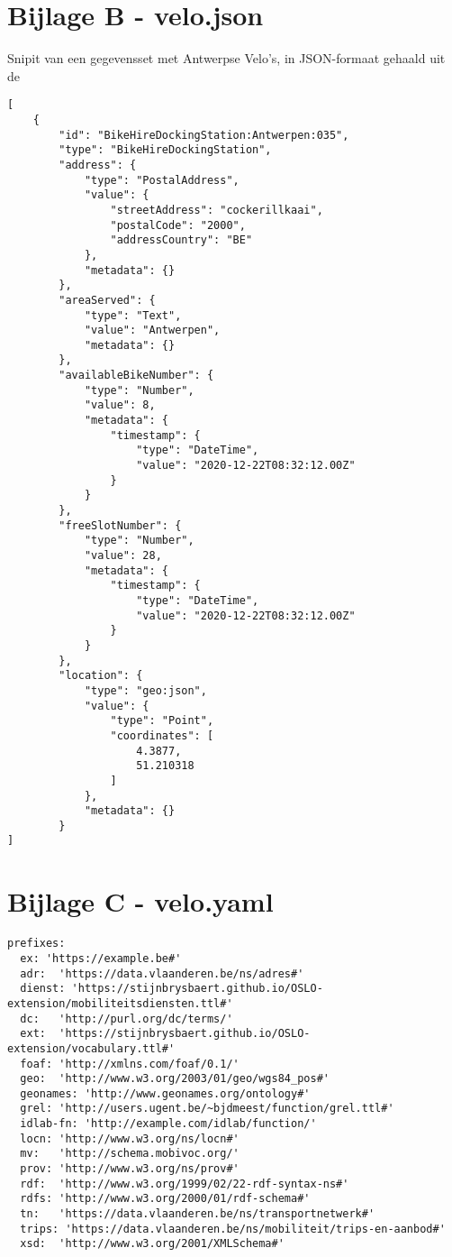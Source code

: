 \begin{appendices}
\section*{Bijlage B - velo.json}
\label{app:velo.json}
Snipit van een gegevensset met Antwerpse Velo's, in JSON-formaat gehaald uit de 
\begin{code}
\begin{verbatim}
[
    {
        "id": "BikeHireDockingStation:Antwerpen:035",
        "type": "BikeHireDockingStation",
        "address": {
            "type": "PostalAddress",
            "value": {
                "streetAddress": "cockerillkaai",
                "postalCode": "2000",
                "addressCountry": "BE"
            },
            "metadata": {}
        },
        "areaServed": {
            "type": "Text",
            "value": "Antwerpen",
            "metadata": {}
        },
        "availableBikeNumber": {
            "type": "Number",
            "value": 8,
            "metadata": {
                "timestamp": {
                    "type": "DateTime",
                    "value": "2020-12-22T08:32:12.00Z"
                }
            }
        },
        "freeSlotNumber": {
            "type": "Number",
            "value": 28,
            "metadata": {
                "timestamp": {
                    "type": "DateTime",
                    "value": "2020-12-22T08:32:12.00Z"
                }
            }
        },
        "location": {
            "type": "geo:json",
            "value": {
                "type": "Point",
                "coordinates": [
                    4.3877,
                    51.210318
                ]
            },
            "metadata": {}
        }
]
\end{verbatim}
\end{code}

\clearpage
\section*{Bijlage C - velo.yaml}
\label{app:velo.yaml}

\begin{code}
\begin{verbatim}
prefixes:
  ex: 'https://example.be#'
  adr:  'https://data.vlaanderen.be/ns/adres#'
  dienst: 'https://stijnbrysbaert.github.io/OSLO-extension/mobiliteitsdiensten.ttl#'
  dc:   'http://purl.org/dc/terms/'
  ext:  'https://stijnbrysbaert.github.io/OSLO-extension/vocabulary.ttl#'
  foaf: 'http://xmlns.com/foaf/0.1/'
  geo:  'http://www.w3.org/2003/01/geo/wgs84_pos#'
  geonames: 'http://www.geonames.org/ontology#'
  grel: 'http://users.ugent.be/~bjdmeest/function/grel.ttl#'
  idlab-fn: 'http://example.com/idlab/function/'
  locn: 'http://www.w3.org/ns/locn#'
  mv:   'http://schema.mobivoc.org/'
  prov: 'http://www.w3.org/ns/prov#'
  rdf:  'http://www.w3.org/1999/02/22-rdf-syntax-ns#'
  rdfs: 'http://www.w3.org/2000/01/rdf-schema#'
  tn:   'https://data.vlaanderen.be/ns/transportnetwerk#'
  trips: 'https://data.vlaanderen.be/ns/mobiliteit/trips-en-aanbod#'
  xsd:  'http://www.w3.org/2001/XMLSchema#'


\end{verbatim}
\end{code}
\end{appendices}
